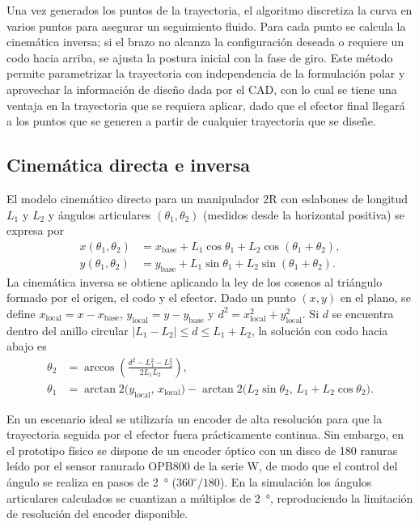 \documentclass[11pt,a4paper]{article}
\begin{document}
Una vez generados los puntos de la trayectoria, el algoritmo discretiza la curva en varios puntos para asegurar un seguimiento fluido.  Para cada punto se calcula la cinemática inversa; si el brazo no alcanza la configuración deseada o requiere un codo hacia arriba, se ajusta la postura inicial con la fase de giro.  Este método permite parametrizar la trayectoria con independencia de la formulación polar y aprovechar la información de diseño dada por el CAD, con lo cual se tiene una ventaja en la trayectoria que se requiera  aplicar, dado que el efector final llegará a los puntos que se generen a partir de cualquier trayectoria que se diseñe.

\subsection{Cinemática directa e inversa}

El modelo cinemático directo para un manipulador 2R con eslabones de longitud $L_1$ y $L_2$ y ángulos articulares $(\theta_1,\theta_2)$ (medidos desde la horizontal positiva) se expresa por
\begin{align}
x(\theta_1,\theta_2) &= x_\text{base} + L_1 \cos \theta_1 + L_2 \cos(\theta_1 + \theta_2),\\
y(\theta_1,\theta_2) &= y_\text{base} + L_1 \sin \theta_1 + L_2 \sin(\theta_1 + \theta_2).
\end{align}
La cinemática inversa se obtiene aplicando la ley de los cosenos al triángulo formado por el origen, el codo y el efector.  Dado un punto $(x,y)$ en el plano, se define $x_\text{local}=x-x_\text{base}$, $y_\text{local}=y-y_\text{base}$ y $d^2=x_\text{local}^2+y_\text{local}^2$.  Si $d$ se encuentra dentro del anillo circular $|L_1-L_2|\le d\le L_1+L_2$, la solución con codo hacia abajo es
\begin{align}
\theta_2 &= \arccos \left(\frac{d^2 - L_1^2 - L_2^2}{2 L_1 L_2}\right),\\
\theta_1 &= \arctan2\bigl(y_\text{local},\,x_\text{local}\bigr)-\arctan2\bigl(L_2\sin\theta_2,\,L_1 + L_2\cos\theta_2\bigr).
\end{align}

En un escenario ideal se utilizaría un encoder de alta resolución para que la trayectoria seguida por el efector fuera prácticamente continua. Sin embargo, en el prototipo físico se dispone de un encoder óptico con un disco de \SI{180}{} ranuras leído por el sensor ranurado OPB800 de la serie W, de modo que el control del ángulo se realiza en pasos de \SI{2}{\degree} ($360^{\circ}/180$). En la simulación los ángulos articulares calculados se cuantizan a múltiplos de \SI{2}{\degree}, reproduciendo la limitación de resolución del encoder disponible.
\end{document}
